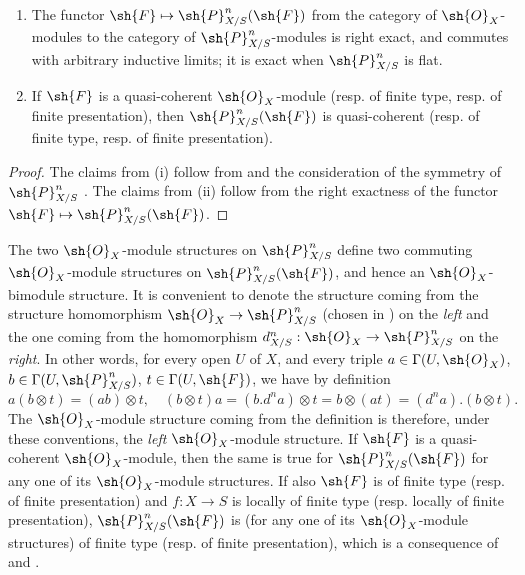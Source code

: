 \begin{proposition}[16.7.3]
\label{IV.16.7.3}
\begin{enumerate}
  \item[\rm{(i)}] The functor $\sh{F} \mapsto \sh{P}_{X/S}^n(\sh{F})$ from the category of $\sh{O}_X$-modules to the category of $\sh{P}_{X/S}^n$-modules is right exact, and commutes with arbitrary inductive limits;
  it is exact when $\sh{P}_{X/S}^n$ is flat.
  \item[\rm{(ii)}] If $\sh{F}$ is a quasi-coherent $\sh{O}_X$-module (resp. of finite type, resp. of finite presentation), then $\sh{P}_{X/S}^n(\sh{F})$ is quasi-coherent (resp. of finite type, resp. of finite presentation).
\end{enumerate}
\end{proposition}

\begin{proof}
The claims from \rm{(i)} follow from  and the consideration of the symmetry of $\sh{P}_{X/S}^n$ .
The claims from \rm{(ii)} follow from the right exactness of the functor $\sh{F} \mapsto \sh{P}_{X/S}^n(\sh{F})$.
\end{proof}

\begin{env}[16.7.4]
\label{IV.16.7.4}
The two $\sh{O}_X$-module structures on $\sh{P}_{X/S}^n$ define two commuting $\sh{O}_X$-module structures on $\sh{P}_{X/S}^n(\sh{F})$, and hence an $\sh{O}_X$-bimodule structure.
It is convenient to denote the structure coming from the structure homomorphism $\sh{O}_X \to \sh{P}_{X/S}^n$ (chosen in ) on the \emph{left} and the one coming from the homomorphism $d_{X/S}^n: \sh{O}_X \to \sh{P}_{X/S}^n$ on the \emph{right}.
In other words, for every open $U$ of $X$, and every triple $a \in \Gamma(U, \sh{O}_X)$, $b \in \Gamma(U, \sh{P}_{X/S}^n)$, $t \in \Gamma(U, \sh{F})$, we have by definition
\[
  \label{IV.16.7.4.1}
  a(b \otimes t) = (ab) \otimes t, \quad (b \otimes t)a = (b.d^n a) \otimes t = b \otimes (at) = (d^na).(b \otimes t).
  \tag{16.7.4.1}
\]
The $\sh{O}_X$-module structure coming from the definition  is therefore, under these conventions, the \emph{left} $\sh{O}_X$-module structure.
If $\sh{F}$ is a quasi-coherent $\sh{O}_X$-module, then the same is true for $\sh{P}_{X/S}^n(\sh{F})$ for any one of its $\sh{O}_X$-module structures.
If also $\sh{F}$ is of finite type (resp. of finite presentation) and $f:X \to S$ is locally of finite type (resp. locally of finite presentation), $\sh{P}_{X/S}^n(\sh{F})$ is (for any one of its $\sh{O}_X$-module structures) of finite type (resp. of finite presentation), which is a consequence of  and .
\end{env}

